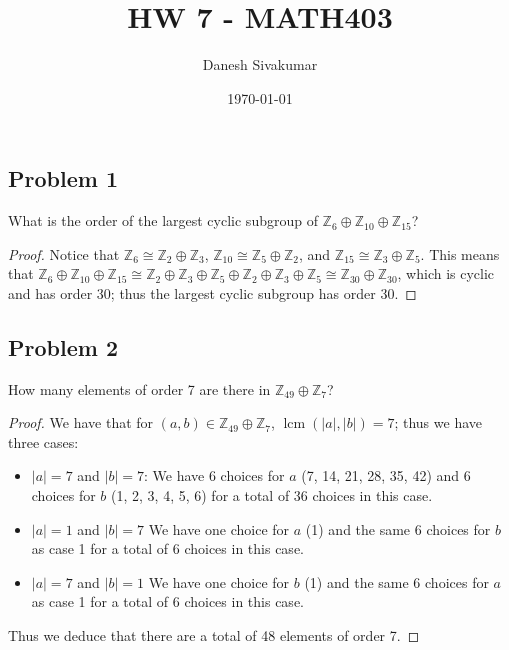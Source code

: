 \documentclass{article}
\title{HW 7 - MATH403}
\author{Danesh Sivakumar}
\date\today
\DeclareMathOperator{\lcm}{lcm}
\begin{document}
\maketitle 

\subsection*{Problem 1}
What is the order of the largest cyclic subgroup of $\mathbb{Z}_6 \oplus \mathbb{Z}_{10} \oplus \mathbb{Z}_{15}$?

\begin{proof}
Notice that $\mathbb{Z}_6 \cong \mathbb{Z}_2 \oplus \mathbb{Z}_3$, $\mathbb{Z}_{10} \cong \mathbb{Z}_5 \oplus \mathbb{Z}_2$, and $\mathbb{Z}_{15} \cong \mathbb{Z}_3 \oplus \mathbb{Z}_5$. This means that $\mathbb{Z}_6 \oplus \mathbb{Z}_{10} \oplus \mathbb{Z}_{15} \cong \mathbb{Z}_2 \oplus \mathbb{Z}_3 \oplus \mathbb{Z}_5 \oplus \mathbb{Z}_2 \oplus \mathbb{Z}_3 \oplus \mathbb{Z}_5 \cong \mathbb{Z}_{30} \oplus \mathbb{Z}_{30}$, which is cyclic and has order 30; thus the largest cyclic subgroup has order 30.

\end{proof}


\subsection*{Problem 2}
How many elements of order 7 are there in $\mathbb{Z}_{49} \oplus \mathbb{Z}_{7}$?

\begin{proof}
We have that for $(a, b) \in \mathbb{Z}_{49} \oplus \mathbb{Z}_{7}$, $\lcm{(|a|, |b|)} = 7$; thus we have three cases:
\begin{itemize}
\item $|a| = 7$ and $|b| = 7$: We have 6 choices for $a$ (7, 14, 21, 28, 35, 42) and 6 choices for $b$ (1, 2, 3, 4, 5, 6) for a total of 36 choices in this case.
\item $|a| = 1$ and $|b| = 7$ We have one choice for $a$ (1) and the same 6 choices for $b$ as case 1 for a total of 6 choices in this case.
\item $|a| = 7$ and $|b| = 1$ We have one choice for $b$ (1) and the same 6 choices for $a$ as case 1 for a total of 6 choices in this case.
\end{itemize}
Thus we deduce that there are a total of 48 elements of order 7.
\end{proof}
\end{document}
